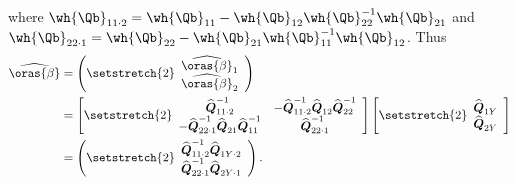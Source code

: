 where $\wh{\Qb}_{11 \cdot 2} = \wh{\Qb}_{11} - \wh{\Qb}_{12}\wh{\Qb}_{22}^{-1}\wh{\Qb}_{21}$ and $\wh{\Qb}_{22 \cdot 1} = \wh{\Qb}_{22} - \wh{\Qb}_{21}\wh{\Qb}_{11}^{-1}\wh{\Qb}_{12}$. Thus
\begin{equation}
    \notag
    \begin{aligned}
        \widehat{\oras{\beta}} & =\left({\setstretch{2}\begin{array}{c}
        \widehat{\oras{\beta}}_1 \\
        \widehat{\oras{\beta}}_2
        \end{array}}\right) \\
        & =\left[{\setstretch{2}\begin{array}{cc}
        \widehat{\boldsymbol{Q}}_{11 \cdot 2}^{-1} & -\widehat{\boldsymbol{Q}}_{11 \cdot 2}^{-1} \widehat{\boldsymbol{Q}}_{12} \widehat{\boldsymbol{Q}}_{22}^{-1} \\
        -\widehat{\boldsymbol{Q}}_{22 \cdot 1}^{-1} \widehat{\boldsymbol{Q}}_{21} \widehat{\boldsymbol{Q}}_{11}^{-1} & \widehat{\boldsymbol{Q}}_{22 \cdot 1}^{-1}
        \end{array}}\right]\left[{\setstretch{2}\begin{array}{c}
        \widehat{\boldsymbol{Q}}_{1 Y} \\
        \widehat{\boldsymbol{Q}}_{2 Y}
        \end{array}}\right] \\
        & =\left({\setstretch{2}\begin{array}{c}
        \widehat{\boldsymbol{Q}}_{11 \cdot 2}^{-1} \widehat{\boldsymbol{Q}}_{1 Y \cdot 2} \\
        \widehat{\boldsymbol{Q}}_{22 \cdot 1}^{-1} \widehat{\boldsymbol{Q}}_{2 Y \cdot 1}
        \end{array}}\right) .
        \end{aligned}
\end{equation}

